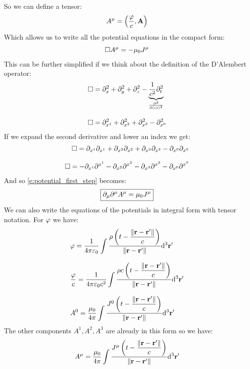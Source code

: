 So we can define a tensor:
\begin{equation}
  A^{\mu} = \left(\dfrac{\varphi}{c}, \vb{A}\right)
\end{equation}
Which allows us to write all the potential equations in the compact form:
\begin{equation} \label{e:potential_first_step}
  \square A^{\mu} = -\mu_0 J^{\mu}
\end{equation}
This can be further simplified if we think about the definition of the D'Alembert operator:
\begin{equation}
  \begin{split}
    &\square = \partial_x^2 + \partial_y^2 + \partial_z^2 - \underbrace{\dfrac{1}{c^2} \partial_t^2}_{\frac{\partial^2}{\partial\left(ct\right)^2}} \\[8pt]
    &\square = \partial_{x^1}^2 + \partial_{x^2}^2 + \partial_{x^3}^2 - \partial_{x^0}^2
  \end{split}
\end{equation}
If we expand the second derivative and lower an index we get:
\begin{equation}
  \begin{split}
    \square = \partial_{x^1}\partial_{x^1} + \partial_{x^2}\partial_{x^2} + \partial_{x^3}\partial_{x^3} - \partial_{x^0}\partial_{x^0} \\[8pt]
    \square = -\partial_{x^1}\partial^{x^1} - \partial_{x^2}\partial^{x^2} - \partial_{x^3}\partial^{x^3} - \partial_{x^0}\partial^{x^0}
  \end{split}
\end{equation}
And so \eqref{e:potential_first_step} becomes:
\begin{equation}
  \boxed{\partial_{\mu}\partial^{\mu} A^{\mu} = \mu_0 J^{\mu}}
\end{equation}
We can also write the equations of the potentials in integral form with tensor notation. For $\varphi$ we have:
\begin{equation}
  \begin{split}
    &\varphi = \dfrac{1}{4 \pi \varepsilon_0}\int \dfrac{\rho \left(t- \dfrac{\norm{\vb{r}-\vb{r}'}}{c}\right)}{\norm{\vb{r}-\vb{r}'}}\mathrm{d}^3 \vb{r}' \\[8pt]
    &\dfrac{\varphi}{c} = \dfrac{1}{4 \pi \varepsilon_0 c^2}\int \dfrac{\rho c \left(t- \dfrac{\norm{\vb{r}-\vb{r}'}}{c}\right)}{\norm{\vb{r}-\vb{r}'}}\mathrm{d}^3 \vb{r}' \\[8pt]
    &A^0 = \dfrac{\mu_0}{4 \pi}\int \dfrac{J^0\left(t- \dfrac{\norm{\vb{r}-\vb{r}'}}{c}\right)}{\norm{\vb{r}-\vb{r}'}}\mathrm{d}^3 \vb{r}'
  \end{split}
\end{equation}
The other components $A^1, A^2, A^3$ are already in this form so we have:
\begin{equation}
  A^{\mu} = \dfrac{\mu_0}{4 \pi}\int \dfrac{J^{\mu}\left(t- \dfrac{\norm{\vb{r}-\vb{r}'}}{c}\right)}{\norm{\vb{r}-\vb{r}'}}\mathrm{d}^3 \vb{r}'
\end{equation}
